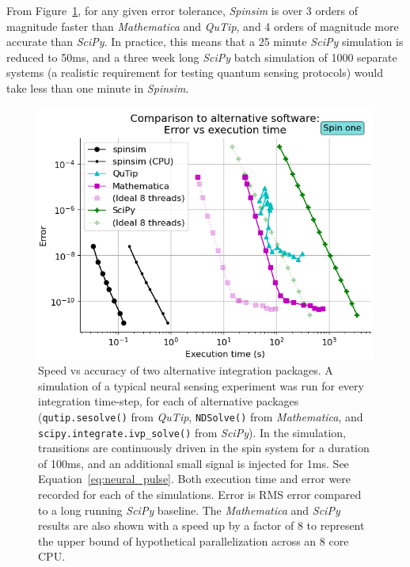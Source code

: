 \documentclass{jors}
\begin{document}
		From Figure~\ref{fig:benchmark_external}, for any given error tolerance, \emph{Spinsim} is over 3 orders of magnitude faster than \emph{Mathematica} and \emph{QuTip}, and 4 orders of magnitude more accurate than \emph{SciPy}.
		In practice, this means that a 25 minute \emph{SciPy} simulation is reduced to 50ms, and a three week long \emph{SciPy} batch simulation of 1000 separate systems (a realistic requirement for testing quantum sensing protocols) would take less than one minute in \emph{Spinsim}.
		\begin{figure}[h!]
			\centering
			\includegraphics[scale=0.475]{benchmark_external_execution_error.png} %
			\caption{Speed vs accuracy of two alternative integration packages.
			A simulation of a typical neural sensing experiment was run for every integration time-step, for each of alternative packages (\texttt{qutip.sesolve()} from \emph{QuTip}, \texttt{NDSolve()} from \emph{Mathematica}, and \texttt{scipy.integrate.ivp\_solve()} from \emph{SciPy}).
			In the simulation, transitions are continuously driven in the spin system for a duration of 100ms, and an additional small signal is injected for 1ms.
			See Equation~\eqref{eq:neural_pulse}.
			Both execution time and error were recorded for each of the simulations.
			Error is RMS error compared to a long running \emph{SciPy} baseline.
			The \emph{Mathematica} and \emph{SciPy} results are also shown with a speed up by a factor of 8 to represent the upper bound of hypothetical parallelization across an 8 core CPU.}
			\label{fig:benchmark_external}
		\end{figure}
\end{document}
